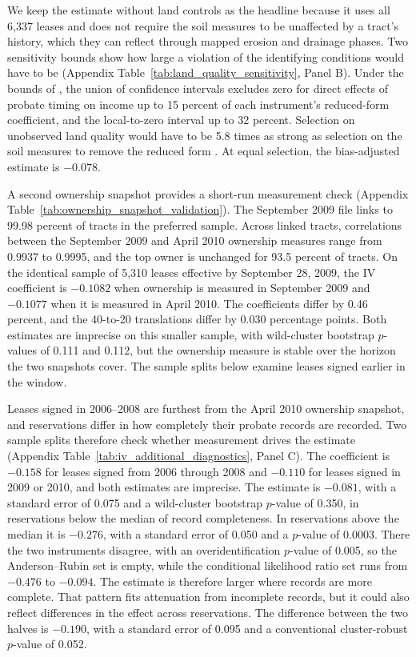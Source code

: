 \documentclass[12pt]{article}
\begin{document}
We keep the estimate without land controls as the headline because it uses all 6,337 leases and does not require the soil measures to be unaffected by a tract's history, which they can reflect through mapped erosion and drainage phases. Two sensitivity bounds show how large a violation of the identifying conditions would have to be (Appendix Table~\ref{tab:land_quality_sensitivity}, Panel B). Under the bounds of \citet{ConleyHansenRossi2012}, the union of confidence intervals excludes zero for direct effects of probate timing on income up to 15 percent of each instrument's reduced-form coefficient, and the local-to-zero interval up to 32 percent. Selection on unobserved land quality would have to be 5.8 times as strong as selection on the soil measures to remove the reduced form \citep{Oster2019}. At equal selection, the bias-adjusted estimate is $-0.078$.

A second ownership snapshot provides a short-run measurement check (Appendix Table~\ref{tab:ownership_snapshot_validation}). The September 2009 file links to 99.98 percent of tracts in the preferred sample. Across linked tracts, correlations between the September 2009 and April 2010 ownership measures range from 0.9937 to 0.9995, and the top owner is unchanged for 93.5 percent of tracts. On the identical sample of 5,310 leases effective by September 28, 2009, the IV coefficient is $-0.1082$ when ownership is measured in September 2009 and $-0.1077$ when it is measured in April 2010. The coefficients differ by 0.46 percent, and the 40-to-20 translations differ by 0.030 percentage points. Both estimates are imprecise on this smaller sample, with wild-cluster bootstrap $p$-values of 0.111 and 0.112, but the ownership measure is stable over the horizon the two snapshots cover. The sample splits below examine leases signed earlier in the window.

Leases signed in 2006--2008 are furthest from the April 2010 ownership snapshot, and reservations differ in how completely their probate records are recorded. Two sample splits therefore check whether measurement drives the estimate (Appendix Table~\ref{tab:iv_additional_diagnostics}, Panel C). The coefficient is $-0.158$ for leases signed from 2006 through 2008 and $-0.110$ for leases signed in 2009 or 2010, and both estimates are imprecise. The estimate is $-0.081$, with a standard error of 0.075 and a wild-cluster bootstrap $p$-value of 0.350, in reservations below the median of record completeness. In reservations above the median it is $-0.276$, with a standard error of 0.050 and a $p$-value of 0.0003. There the two instruments disagree, with an overidentification $p$-value of 0.005, so the Anderson--Rubin set is empty, while the conditional likelihood ratio set runs from $-0.476$ to $-0.094$. The estimate is therefore larger where records are more complete. That pattern fits attenuation from incomplete records, but it could also reflect differences in the effect across reservations. The difference between the two halves is $-0.190$, with a standard error of 0.095 and a conventional cluster-robust $p$-value of 0.052.
\end{document}
